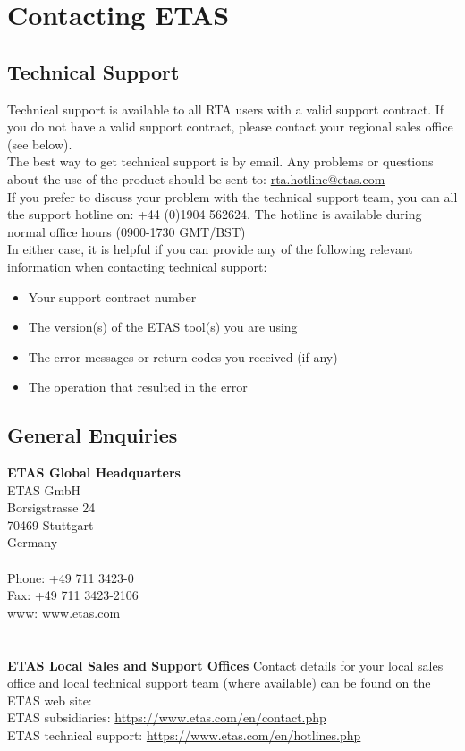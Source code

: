 \chapter{Contacting ETAS}

\section{Technical Support}
Technical support is available to all RTA users with a valid support contract. If you do not have a valid support contract, please contact your regional sales office (see below).
\\
The best way to get technical support is by email. Any problems or questions about the use of the product should be sent to:  \href{rta.hotline@etas.com}{rta.hotline@etas.com}   
\\
If you prefer to discuss your problem with the technical support team, you can all the support hotline on:  +44 (0)1904 562624. The hotline is available during normal office hours (0900-1730 GMT/BST)
\\
In either case, it is helpful if you can provide any of the following relevant information when contacting technical support:

\begin{itemize}
	\item Your support contract number
	\item The version(s) of the ETAS tool(s) you are using
	\item The error messages or return codes you received (if any)
	\item The operation that resulted in the error
\end{itemize}

\section{General Enquiries}
\textbf{ETAS Global Headquarters}
\\
ETAS GmbH\\
Borsigstrasse 24\\
70469 Stuttgart\\
Germany
\\
\\
Phone:	+49 711 3423-0\\
Fax:	+49 711 3423-2106\\
www:	www.etas.com \\
\\
\\
\textbf{ETAS Local Sales and Support Offices}
Contact details for your local sales office and local technical support team (where available) can be found on the ETAS web site:
\\
ETAS subsidiaries:		\url{https://www.etas.com/en/contact.php}\\
ETAS technical support:		\url{https://www.etas.com/en/hotlines.php}
